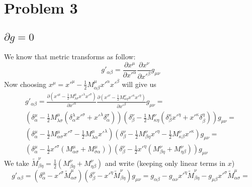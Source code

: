 \section*{Problem 3}

\subsection{\texorpdfstring{$\partial g = 0$}{TEXT}}

We know that metric transforms as follow:
%
\begin{equation}
    g'_{\alpha\beta} = \frac{\partial x^\mu}{\partial x'^\alpha}
    \frac{\partial x^\nu}{\partial x'^\beta} g_{\mu\nu}
\end{equation}
%
Now choosing $x^\mu = x'^\mu - \frac{1}{2} M_{\alpha\beta}^\mu x'^\alpha
    x'^\beta $ will give us
%
\begin{multline}
    g'_{\alpha\beta} = \frac{\partial
        (x'^\mu - \frac{1}{2} M_{\lambda\sigma}^\mu x'^\lambda x'^\sigma)}{\partial x'^\alpha}
    \frac{\partial
        (x'^\nu - \frac{1}{2} M_{\kappa\eta}^\nu x'^\kappa x'^\eta)}{\partial x'^\beta}
    g_{\mu\nu} =\\
    \left(\delta^\mu_\alpha -
    \frac{1}{2} M_{\lambda\sigma}^\mu
    (\delta^\lambda_\alpha x'^\sigma + x'^\lambda \delta^\sigma_\alpha)\right)
    \left(\delta^\nu_\beta -
    \frac{1}{2} M_{\kappa\eta}^\nu
    (\delta^\kappa_\beta x'^\eta + x'^\kappa \delta^\eta_\beta)\right)g_{\mu\nu} = \\
    \left(\delta^\mu_\alpha -
    \frac{1}{2} M_{\alpha\sigma}^\mu x'^\sigma -
    \frac{1}{2} M_{\lambda\alpha}^\mu x'^\lambda\right)
    \left(\delta^\nu_\beta -
    \frac{1}{2} M_{\beta\eta}^\nu x'^\eta -
    \frac{1}{2} M_{\kappa\beta}^\nu x'^\kappa\right)g_{\mu\nu} = \\
    \left(\delta^\mu_\alpha -
    \frac{1}{2}x'^\sigma( M_{\alpha\sigma}^\mu + M_{\sigma\alpha}^\mu)\right)
    \left(\delta^\nu_\beta -
    \frac{1}{2} x'^\eta (M_{\beta\eta}^\nu + M_{\eta\beta}^\nu)\right)g_{\mu\nu}
\end{multline}
%
We take $\tilde{M}_{\beta\eta}^\nu = \frac{1}{2}(M_{\beta\eta}^\nu +
    M_{\eta\beta}^\nu)$ and write (keeping only linear terms in $x$)
%
\begin{equation}
    g'_{\alpha\beta} =
    \left(\delta^\mu_\alpha -
    x'^\sigma \tilde{M}_{\alpha\sigma}^\mu\right)
    \left(\delta^\nu_\beta -
    x'^\eta \tilde{M}_{\beta\eta}^\nu\right)g_{\mu\nu} =
    g_{\alpha\beta} -
    g_{\alpha\nu} x'^\eta \tilde{M}_{\beta\eta}^\nu -
    g_{\mu\beta} x'^\sigma \tilde{M}_{\alpha\sigma}^\mu =
\end{equation}
